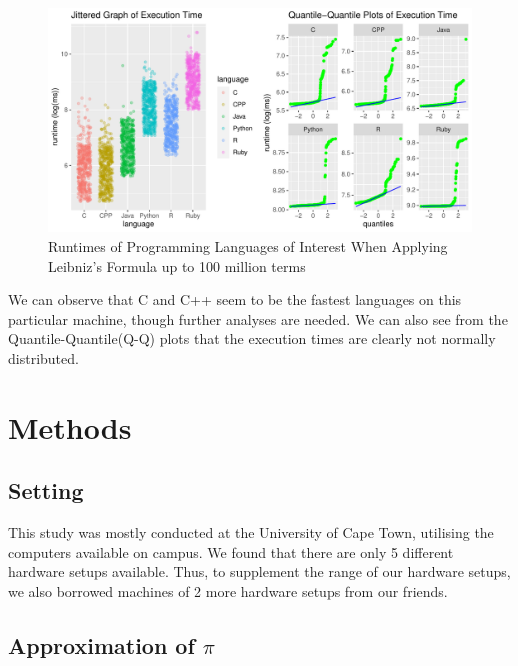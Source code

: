 \documentclass[12pt,halfline,a4paper,]{ouparticle}
\begin{document}
\begin{figure}[H]
\includegraphics[width=1\linewidth]{backup_files/figure-latex/figPrior-1} \caption{Runtimes of Programming Languages of Interest When Applying Leibniz's Formula up to 100 million terms}\label{fig:figPrior}
\end{figure}

We can observe that C and C++ seem to be the fastest languages on this
particular machine, though further analyses are needed. We can also see
from the Quantile-Quantile(Q-Q) plots that the execution times are
clearly not normally distributed. \newpage

\hypertarget{methods}{%
\section{Methods}\label{methods}}

\hypertarget{setting}{%
\subsection{Setting}\label{setting}}

This study was mostly conducted at the University of Cape Town,
utilising the computers available on campus. We found that there are
only 5 different hardware setups available. Thus, to supplement the
range of our hardware setups, we also borrowed machines of 2 more
hardware setups from our friends.

\hypertarget{approximation-of-pi}{%
\subsection{\texorpdfstring{Approximation of
\(\pi\)}{Approximation of \textbackslash pi}}\label{approximation-of-pi}}
\end{document}
